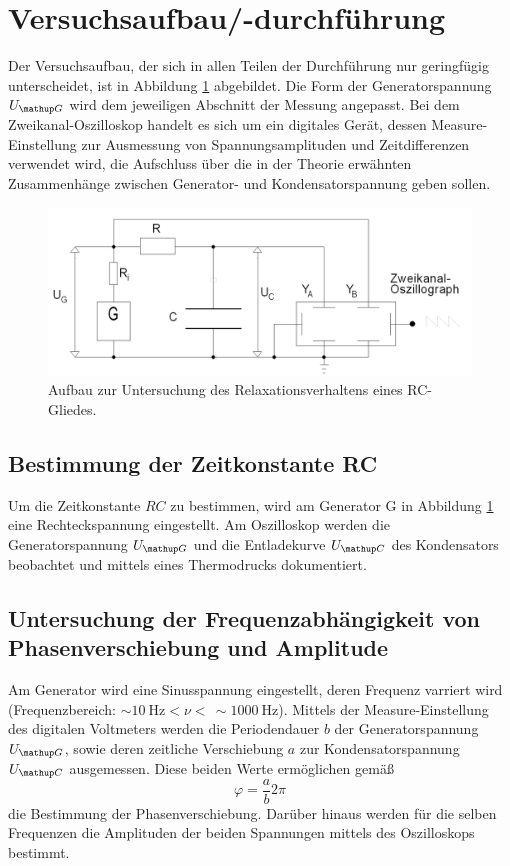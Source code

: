 \section{Versuchsaufbau/-durchführung}
Der Versuchsaufbau, der sich in allen Teilen der Durchführung nur geringfügig unterscheidet, ist in Abbildung \ref{fig: aufbau} abgebildet.
Die Form der Generatorspannung $U\ua{G}$ wird dem jeweiligen Abschnitt der Messung angepasst. Bei dem Zweikanal-Oszilloskop handelt es sich um ein
digitales Gerät, dessen Measure-Einstellung zur Ausmessung von Spannungsamplituden und Zeitdifferenzen verwendet wird, die Aufschluss über
die in der Theorie erwähnten Zusammenhänge zwischen Generator- und Kondensatorspannung geben sollen.
\begin{figure}
  \centering
  \includegraphics[width = \textwidth]{pics/aufbau.png}
  \caption{Aufbau zur Untersuchung des Relaxationsverhaltens eines RC-Gliedes.}
  \label{fig: aufbau}
\end{figure}

\subsection{Bestimmung der Zeitkonstante RC}
Um die Zeitkonstante $RC$ zu bestimmen, wird am Generator G in Abbildung \ref{fig: aufbau} eine Rechteckspannung eingestellt.
Am Oszilloskop werden die Generatorspannung $U\ua{G}$ und die Entladekurve $U\ua{C}$ des Kondensators beobachtet und mittels eines Thermodrucks
dokumentiert.

\subsection{Untersuchung der Frequenzabhängigkeit von Phasenverschiebung und Amplitude}
Am Generator wird eine Sinusspannung eingestellt, deren Frequenz varriert wird (Frequenzbereich: $\sim\SI{10}{\hertz}<\nu<\, \sim\SI{1000}{\hertz}$).
Mittels der Measure-Einstellung des digitalen Voltmeters werden die Periodendauer $b$ der
Generatorspannung $U\ua{G}$, sowie deren zeitliche Verschiebung $a$ zur Kondensatorspannung $U\ua{C}$ ausgemessen. Diese beiden Werte ermöglichen gemäß
\begin{equation}
  \varphi = \frac{a}{b}2\pi
  \label{eq:phasenverschiebung}
\end{equation}
die Bestimmung der Phasenverschiebung. Darüber hinaus werden für die selben Frequenzen die Amplituden der beiden Spannungen mittels des Oszilloskops
bestimmt.

